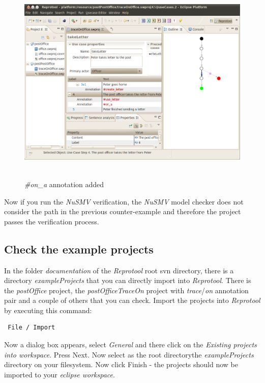 \begin{figure}[ht]
  \centering
  \includegraphics[height=280pt]{images/reprotoolOnA}
  \caption{\emph{\#on\_a} annotation added}
  \label{fig:reprotoolOnA}
\end{figure}

Now if you run the \emph{NuSMV} verification, the \emph{NuSMV} model checker does not consider the path in the previous counter-example
and therefore the project passes the verification process. 

\subsection{Check the example projects}
In the folder \emph{documentation} of the \emph{Reprotool} root svn directory, there is a directory \emph{exampleProjects} that you
can directly import into \emph{Reprotool}. There is the \emph{postOffice} project, the \emph{postOfficeTraceOn} project with \emph{trace}/\emph{on}
annotation pair and a couple of others that you can check. Import the projects into \emph{Reprotool} by executing this command:
\begin{verbatim}
 File / Import
\end{verbatim}
Now a dialog box appears, select \emph{General} and there click on the \emph{Existing projects into workspace}. Press Next. Now select
as the root directorythe \emph{exampleProjects} directory on your filesystem. Now click Finish - the projects should now be imported
to your \emph{eclipse workspace}.

